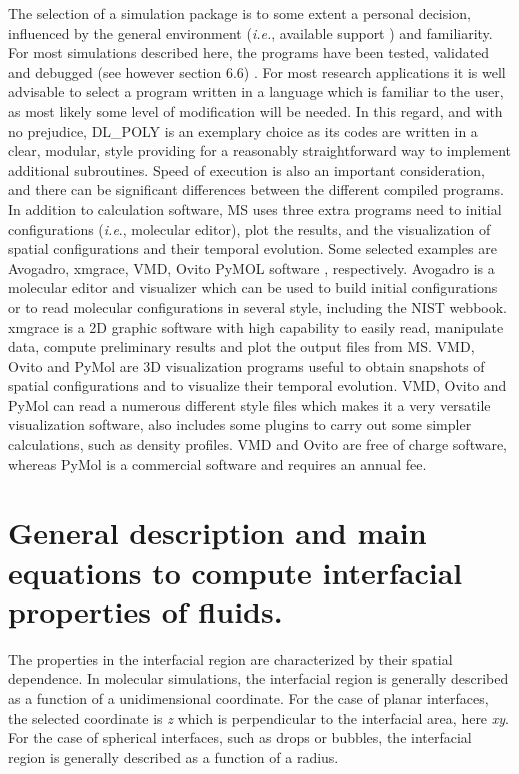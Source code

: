 \documentclass{scrbook}
\begin{document}
The selection of a simulation package is to some extent a personal decision,
influenced by the general environment (\textit{i.e.}, available support ) and
familiarity. For most simulations described here, the programs have been
tested, validated and debugged (see however section 6.6) . For most research
applications it is well advisable to select a program written in a language
which is familiar to the user, as most likely some level of modification will
be needed. In this regard, and with no prejudice, DL\_POLY is an exemplary
choice as its codes are written in a clear, modular, style providing for
a reasonably straightforward way to implement additional subroutines. Speed of
execution is also an important consideration, and there can be significant
differences between the different compiled programs. In addition to calculation
software, MS uses three extra programs need to initial configurations
(\textit{i.e}., molecular editor), plot the results, and the visualization of
spatial configurations and their temporal evolution. Some selected examples are
Avogadro\citep{avogadro}, xmgrace\citep{xmgrace},
VMD\citep{VMD}, Ovito\citep{ovito} PyMOL software\citep{pymol}
, respectively. Avogadro is a molecular editor and visualizer which can
be used to build initial configurations or to read molecular configurations in
several style, including the NIST webbook\citep{lemmon2013}. xmgrace is a 2D graphic software with high capability to
easily read, manipulate data, compute preliminary results and plot the output
files from MS. VMD, Ovito and PyMol are 3D visualization programs useful to
obtain snapshots of spatial configurations and to visualize their temporal
evolution. VMD, Ovito and PyMol can read a numerous different style files which
makes it a very versatile visualization software, also includes some plugins to
carry out some simpler calculations, such as density profiles. VMD and Ovito
are free of charge software, whereas PyMol is a commercial software and
requires an annual fee.

\chapter{General description and main equations to compute interfacial properties of fluids.}

The properties in the interfacial region are characterized by their spatial
dependence. In molecular simulations, the interfacial region is generally
described as a function of a unidimensional coordinate. For the case of planar
interfaces, the selected coordinate is \textit{z} which is perpendicular to the
interfacial area, here \textit{xy}. For the case of spherical interfaces, such
as drops or bubbles, the interfacial region is generally described as
a function of a radius.
\end{document}
